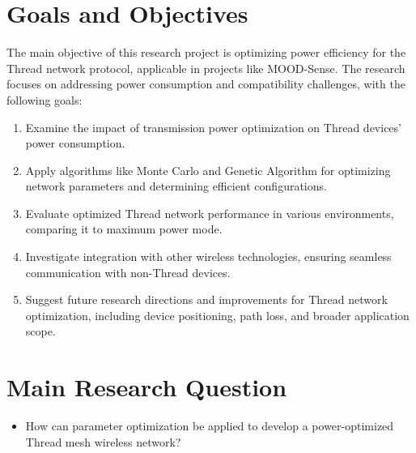 \section{Goals and Objectives}
The main objective of this research project is optimizing power efficiency for the Thread network protocol, applicable in projects like MOOD-Sense. The research focuses on addressing power consumption and compatibility challenges, with the following goals:

\vspace{2mm}
\begin{enumerate}
    \item Examine the impact of transmission power optimization on Thread devices' power consumption.
    \item Apply algorithms like Monte Carlo and Genetic Algorithm for optimizing network parameters and determining efficient configurations.
    \item Evaluate optimized Thread network performance in various environments, comparing it to maximum power mode.
    \item Investigate integration with other wireless technologies, ensuring seamless communication with non-Thread devices.
    \item Suggest future research directions and improvements for Thread network optimization, including device positioning, path loss, and broader application scope.
\end{enumerate}
\vspace{3mm}


\section{Main Research Question}
\vspace{2mm}
\begin{itemize}
    \item How can parameter optimization be applied to develop a power-optimized Thread mesh wireless network?
\end{itemize}
\vspace{3mm}


